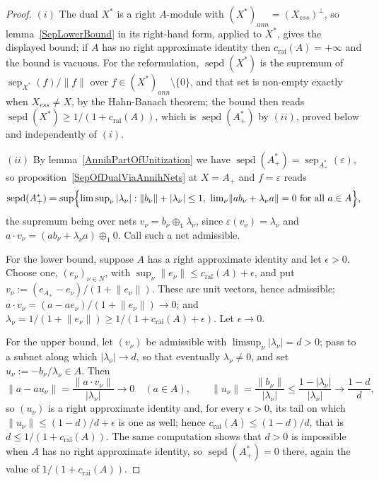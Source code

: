 \documentclass[11pt]{article}
\theoremstyle{plain}
\theoremstyle{definition}
\DeclareMathOperator{\sep}{sep}
\DeclareMathOperator{\sepd}{sepd}
\newcommand{\crai}{c_{\mathrm{rai}}}
\begin{document}
\begin{proof}
$(i)$ The dual $X^*$ is a right $A$-module with ${(X^*)}_{ann}={(X_{ess})}^\perp$,
so lemma~\ref{SepLowerBound} in its right-hand form, applied to $X^*$, gives the
displayed bound; if $A$ has no right approximate identity then $\crai(A)=+\infty$
and the bound is vacuous. For the reformulation, $\sepd(X^*)$ is the supremum of
$\sep_{X^*}(f)/\lVert f\rVert$ over $f\in{(X^*)}_{ann}\setminus \{0 \}$, and that
set is non-empty exactly when $X_{ess}\neq X$, by the Hahn-Banach theorem; the
bound then reads $\sepd(X^*)\geq 1/(1+\crai(A))$, which is $\sepd(A_+^*)$ by
$(ii)$, proved below and independently of $(i)$.

$(ii)$ By lemma~\ref{AnnihPartOfUnitization} we have
$\sepd(A_+^*)=\sep_{A_+^*}(\varepsilon)$, so
proposition~\ref{SepOfDualViaAnnihNets} at $X=A_+$ and $f=\varepsilon$ reads
\[
\sepd(A_+^*)=\sup \Bigl\{
  \textstyle\limsup_\nu|\lambda_\nu|:
  \lVert b_\nu\rVert+|\lambda_\nu|\leq 1,\
  \lim_\nu\lVert ab_\nu+\lambda_\nu a\rVert=0\ \text{for all }a\in A
 \Bigr\},
\]
the supremum being over nets $v_\nu=b_\nu\oplus_1\lambda_\nu$, since
$\varepsilon(v_\nu)=\lambda_\nu$ and
$a\cdot v_\nu=(ab_\nu+\lambda_\nu a)\oplus_1 0$. Call such a net admissible.

For the lower bound, suppose $A$ has a right approximate identity and let
$\epsilon>0$. Choose one, ${(e_\nu)}_{\nu\in N}$, with
$\sup_\nu\lVert e_\nu\rVert\leq\crai(A)+\epsilon$, and put
$v_\nu:=(e_{A_+}-e_\nu)/(1+\lVert e_\nu\rVert)$. These are unit vectors, hence
admissible; $a\cdot v_\nu=(a-ae_\nu)/(1+\lVert e_\nu\rVert)\to 0$; and
$\lambda_\nu=1/(1+\lVert e_\nu\rVert)\geq 1/(1+\crai(A)+\epsilon)$. Let
$\epsilon\to 0$.

For the upper bound, let ${(v_\nu)}$ be admissible with
$\limsup_\nu|\lambda_\nu|=d>0$; pass to a subnet along which
$|\lambda_\nu|\to d$, so that eventually $\lambda_\nu\neq 0$, and set
$u_\nu:=-b_\nu/\lambda_\nu\in A$. Then
\[
\lVert a-au_\nu\rVert=\frac{\lVert a\cdot v_\nu\rVert}{|\lambda_\nu|}
\longrightarrow 0\quad(a\in A),
\qquad
\lVert u_\nu\rVert=\frac{\lVert b_\nu\rVert}{|\lambda_\nu|}
\leq\frac{1-|\lambda_\nu|}{|\lambda_\nu|}\longrightarrow\frac{1-d}{d} ,
\]
so ${(u_\nu)}$ is a right approximate identity and, for every $\epsilon>0$, its
tail on which $\lVert u_\nu\rVert\leq(1-d)/d+\epsilon$ is one as well; hence
$\crai(A)\leq(1-d)/d$, that is $d\leq 1/(1+\crai(A))$. The same computation shows
that $d>0$ is impossible when $A$ has no right approximate identity, so
$\sepd(A_+^*)=0$ there, again the value of $1/(1+\crai(A))$.


\end{proof}
\end{document}
